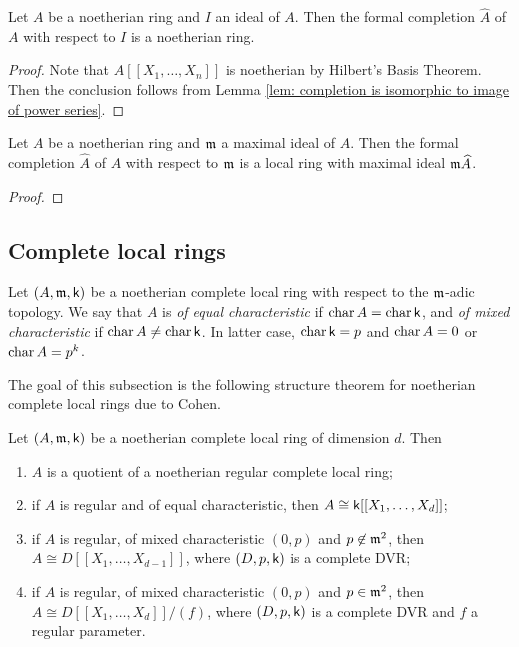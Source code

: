     \begin{proposition}\label{prop: completion is noetherian}
        Let \(A\) be a noetherian ring and \(I\) an ideal of \(A\). 
        Then the formal completion \(\widehat{A}\) of \(A\) with respect to \(I\) is a noetherian ring.
    \end{proposition}
    \begin{proof}
        Note that \(A[[X_1, \ldots, X_n]]\) is noetherian by Hilbert's Basis Theorem.
        Then the conclusion follows from Lemma \ref{lem: completion is isomorphic to image of power series}.
    \end{proof}

    \begin{proposition}\label{prop: completion with respect to maximal ideal is local}
        Let \(A\) be a noetherian ring and \({\mathfrak{m}}\) a maximal ideal of \(A\). 
        Then the formal completion \(\widehat{A}\) of \(A\) with respect to \({\mathfrak{m}}\) is a local ring with maximal ideal \({\mathfrak{m}} \widehat{A}\).
    \end{proposition}
    \begin{proof}
    \end{proof}

\subsection{Complete local rings}

    Let \((A, {\mathfrak{m}}, {\mathsf{k}})\) be a noetherian complete local ring with respect to the \({\mathfrak{m}}\)-adic 
    topology.
    We say that \(A\) is \emph{of equal characteristic} if \(\operatorname{char} A = \operatorname{char} {\mathsf{k}}\), and \emph{of mixed characteristic} if \(\operatorname{char} A \neq \operatorname{char} {\mathsf{k}}\).
    In latter case, \(\operatorname{char} {\mathsf{k}} = p\) and \(\operatorname{char} A = 0\) or \(\operatorname{char} A = p^k\).

    The goal of this subsection is the following structure theorem for noetherian complete local rings due to Cohen. 

    \begin{theorem}\label{thm: Cohen Structure Theorem}
        Let \((A,{\mathfrak{m}},{\mathsf{k}})\) be a noetherian complete local ring of dimension \(d\).
        Then 
        \begin{enumerate}
            \item \(A\) is a quotient of a noetherian regular complete local ring;
            \item if \(A\) is regular and of equal characteristic, then \(A \cong {\mathsf{k}}[[X_1, \ldots, X_d]]\);
            \item if \(A\) is regular, of mixed characteristic \((0,p)\) and \(p \not\in {\mathfrak{m}}^2\), then \(A \cong D[[X_1, \ldots, X_{d-1}]]\), where \((D,p,{\mathsf{k}})\) is a complete DVR;
            \item if \(A\) is regular, of mixed characteristic \((0,p)\) and \(p \in {\mathfrak{m}}^2\), then \(A \cong D[[X_1, \ldots, X_{d}]]/(f)\), where \((D,p,{\mathsf{k}})\) is a complete DVR and \(f\) a regular parameter.
        \end{enumerate}
    \end{theorem}


